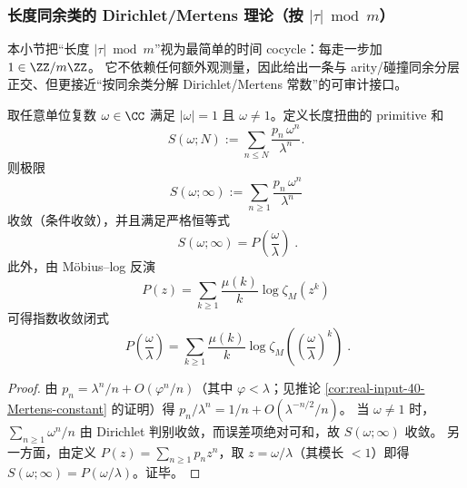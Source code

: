\subsubsection{长度同余类的 Dirichlet/Mertens 理论（按 \texorpdfstring{$|\tau|\bmod m$}{|tau| mod m}）}\label{app:real-input-40-length-mertens}
本小节把“长度 \(|\tau|\bmod m\)”视为最简单的时间 cocycle：每走一步加 \(1\in\ZZ/m\ZZ\)。
它不依赖任何额外观测量，因此给出一条与 arity/碰撞同余分层正交、但更接近“按同余类分解 Dirichlet/Mertens 常数”的可审计接口。

\begin{proposition}\label{prop:real-input-40-length-twist-converge}
取任意单位复数 \(\omega\in\CC\) 满足 \(|\omega|=1\) 且 \(\omega\neq 1\)。定义长度扭曲的 primitive 和
\[
S(\omega;N):=\sum_{n\le N}\frac{p_n\,\omega^n}{\lambda^n}.
\]
则极限
\[
S(\omega;\infty):=\sum_{n\ge 1}\frac{p_n\,\omega^n}{\lambda^n}
\]
收敛（条件收敛），并且满足严格恒等式
\[
\boxed{\;
S(\omega;\infty)=P\!\left(\frac{\omega}{\lambda}\right)\; }.
\]
此外，由 Möbius--log 反演
\[
P(z)=\sum_{k\ge 1}\frac{\mu(k)}{k}\log\zeta_M(z^k)
\]
可得指数收敛闭式
\[
\boxed{\;
P\!\left(\frac{\omega}{\lambda}\right)
=\sum_{k\ge 1}\frac{\mu(k)}{k}\log \zeta_M\!\left(\left(\frac{\omega}{\lambda}\right)^k\right)\; }.
\]
\end{proposition}
\begin{proof}
由 \(p_n=\lambda^n/n+O(\varphi^n/n)\)（其中 \(\varphi<\lambda\)；见推论 \ref{cor:real-input-40-Mertens-constant} 的证明）得
\(
p_n/\lambda^n=1/n+O(\lambda^{-n/2}/n)
\)。
当 \(\omega\neq 1\) 时，\(\sum_{n\ge 1}\omega^n/n\) 由 Dirichlet 判别收敛，而误差项绝对可和，故 \(S(\omega;\infty)\) 收敛。
另一方面，由定义 \(P(z)=\sum_{n\ge 1}p_n z^n\)，取 \(z=\omega/\lambda\)（其模长 \(<1\)）即得 \(S(\omega;\infty)=P(\omega/\lambda)\)。证毕。
\end{proof}

